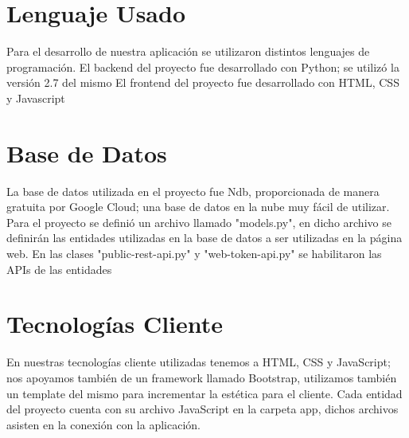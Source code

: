 \documentclass[a4paper,10pt]{article}
\begin{document}
\section{Lenguaje Usado}
Para el desarrollo de nuestra aplicación se utilizaron distintos lenguajes de programación.\linebreak
\newline
El backend del proyecto fue desarrollado con Python; se utilizó la versión 2.7 del mismo\linebreak
\newline
El frontend del proyecto fue desarrollado con HTML, CSS y Javascript\linebreak
\newline

\section{Base de Datos}
La base de datos utilizada en el proyecto fue Ndb, proporcionada de manera gratuita por Google Cloud; una base de datos en la nube muy fácil de utilizar.\linebreak
Para el proyecto se definió un archivo llamado "models.py", en dicho archivo se definirán las entidades utilizadas en la base de datos a ser utilizadas en la página web.\linebreak
En las clases "public-rest-api.py" y "web-token-api.py" se habilitaron las APIs de las entidades\linebreak
\newline

\section{Tecnologías Cliente}
En nuestras tecnologías cliente utilizadas tenemos a HTML, CSS y JavaScript; nos apoyamos también de un framework llamado Bootstrap, utilizamos también un template del mismo para incrementar la estética para el cliente.\linebreak
Cada entidad del proyecto cuenta con su archivo JavaScript en la carpeta app, dichos archivos asisten en la conexión con la aplicación.\linebreak
\end{document}
